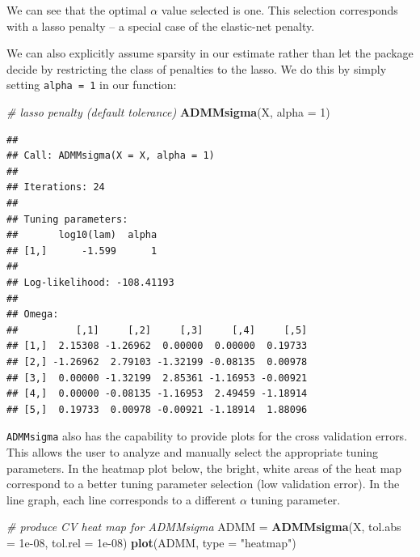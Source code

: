 \documentclass[11pt,]{report}
\newenvironment{Shaded}{\begin{snugshade}}{\end{snugshade}}
\newcommand{\CommentTok}[1]{\textcolor[rgb]{0.56,0.35,0.01}{\textit{#1}}}
\newcommand{\DataTypeTok}[1]{\textcolor[rgb]{0.13,0.29,0.53}{#1}}
\newcommand{\DecValTok}[1]{\textcolor[rgb]{0.00,0.00,0.81}{#1}}
\newcommand{\FloatTok}[1]{\textcolor[rgb]{0.00,0.00,0.81}{#1}}
\newcommand{\KeywordTok}[1]{\textcolor[rgb]{0.13,0.29,0.53}{\textbf{#1}}}
\newcommand{\NormalTok}[1]{#1}
\newcommand{\StringTok}[1]{\textcolor[rgb]{0.31,0.60,0.02}{#1}}
\begin{document}
\vspace{0.5cm}

We can see that the optimal \(\alpha\) value selected is one. This selection corresponds with a lasso penalty -- a special case of the elastic-net penalty.

We can also explicitly assume sparsity in our estimate rather than let the package decide by restricting the class of penalties to the lasso. We do this by simply setting \texttt{alpha\ =\ 1} in our function:

\vspace{0.5cm}

\begin{Shaded}
\begin{Highlighting}[]
\CommentTok{# lasso penalty (default tolerance)}
\KeywordTok{ADMMsigma}\NormalTok{(X, }\DataTypeTok{alpha =} \DecValTok{1}\NormalTok{)}
\end{Highlighting}
\end{Shaded}

\begin{verbatim}
## 
## Call: ADMMsigma(X = X, alpha = 1)
## 
## Iterations: 24
## 
## Tuning parameters:
##       log10(lam)  alpha
## [1,]      -1.599      1
## 
## Log-likelihood: -108.41193
## 
## Omega:
##          [,1]     [,2]     [,3]     [,4]     [,5]
## [1,]  2.15308 -1.26962  0.00000  0.00000  0.19733
## [2,] -1.26962  2.79103 -1.32199 -0.08135  0.00978
## [3,]  0.00000 -1.32199  2.85361 -1.16953 -0.00921
## [4,]  0.00000 -0.08135 -1.16953  2.49459 -1.18914
## [5,]  0.19733  0.00978 -0.00921 -1.18914  1.88096
\end{verbatim}

\vspace{0.5cm}

\texttt{ADMMsigma} also has the capability to provide plots for the cross validation errors. This allows the user to analyze and manually select the appropriate tuning parameters. In the heatmap plot below, the bright, white areas of the heat map correspond to a better tuning parameter selection (low validation error). In the line graph, each line corresponds to a different \(\alpha\) tuning parameter.

\vspace{0.5cm}

\begin{Shaded}
\begin{Highlighting}[]
\CommentTok{# produce CV heat map for ADMMsigma}
\NormalTok{ADMM =}\StringTok{ }\KeywordTok{ADMMsigma}\NormalTok{(X, }\DataTypeTok{tol.abs =} \FloatTok{1e-08}\NormalTok{, }\DataTypeTok{tol.rel =} \FloatTok{1e-08}\NormalTok{)}
\KeywordTok{plot}\NormalTok{(ADMM, }\DataTypeTok{type =} \StringTok{"heatmap"}\NormalTok{)}
\end{Highlighting}
\end{Shaded}
\end{document}
